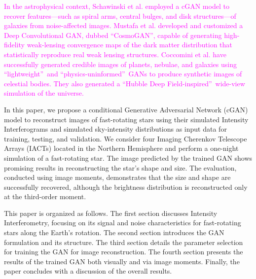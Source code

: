 \textcolor{magenta}{In the astrophysical context, Schawinski et al. \cite{schawinski2017galaxypics} employed a cGAN model to recover features—such as spiral arms, central bulges, and disk structures—of galaxies from noise-affected images. Mustafa et al. \citep{mustafa2019cosmogan} developed and customized a Deep Convolutional GAN, dubbed \textquotedblleft CosmoGAN\textquotedblright, capable of generating high-fidelity weak-lensing convergence maps of the dark matter distribution that statistically reproduce real weak lensing structures. Coccomini et al. \citep{coccomini2021lightweightgan} have successfully generated credible images of planets, nebulae, and galaxies using \textquotedblleft lightweight\textquotedblright\ and \textquotedblleft physics-uninformed\textquotedblright\ GANs to produce synthetic images of celestial bodies. They also generated a \textquotedblleft Hubble Deep Field-inspired\textquotedblright\ wide-view simulation of the universe. 
}

In this paper, we propose a conditional Generative Adversarial Network (cGAN) model \citep{isola2017image} to reconstruct images of fast-rotating stars using their simulated Intensity Interferograms and simulated sky-intensity distributions as input data for training, testing, and validation. We consider four Imaging Cherenkov Telescope Arrays (IACTs) located in the Northern Hemisphere and perform a one-night simulation of a fast-rotating star. The image predicted by the trained GAN shows promising results in reconstructing the star’s shape and size. The evaluation, conducted using image moments, demonstrates that the size and shape are successfully recovered, although the brightness distribution is reconstructed only at the third-order moment.

This paper is organized as follows. The first section discusses Intensity Interferometry, focusing on its signal and noise characteristics for fast-rotating stars along the Earth’s rotation. The second section introduces the GAN formulation and its structure. The third section details the parameter selection for training the GAN for image reconstruction. The fourth section presents the results of the trained GAN both visually and via image moments. Finally, the paper concludes with a discussion of the overall results.